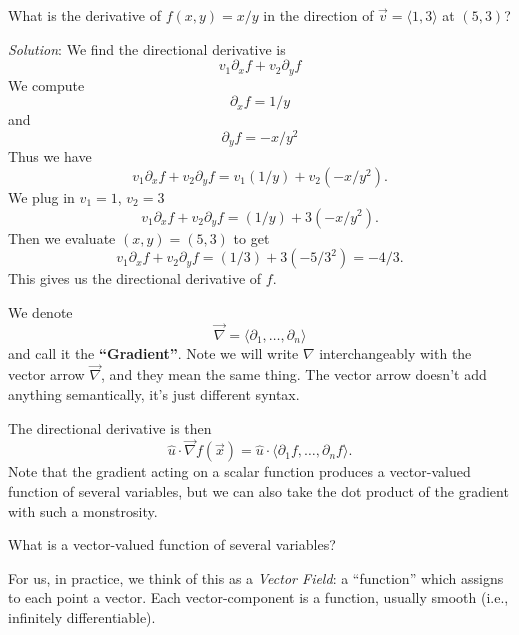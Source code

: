 \begin{example}
What is the derivative of $f(x,y)=x/y$ in the direction of
$\vec{v}=\langle 1,3\rangle$ at $(5,3)$?

\emph{Solution}: We find the directional derivative is
\begin{equation}
v_{1}\partial_{x}f + v_{2}\partial_{y}f
\end{equation}
We compute
\begin{equation}
\partial_{x}f = 1/y
\end{equation}
and
\begin{equation}
\partial_{y}f = -x/y^{2}
\end{equation}
Thus we have
\begin{equation}
v_{1}\partial_{x}f + v_{2}\partial_{y}f = v_{1}(1/y) + v_{2}(-x/y^{2}).
\end{equation}
We plug in $v_{1}=1$, $v_{2}=3$
\begin{equation}
v_{1}\partial_{x}f + v_{2}\partial_{y}f = (1/y) + 3(-x/y^{2}).
\end{equation}
Then we evaluate $(x,y)=(5,3)$ to get
\begin{equation}
v_{1}\partial_{x}f + v_{2}\partial_{y}f = (1/3) + 3(-5/3^{2})
=-4/3.
\end{equation}
This gives us the directional derivative of $f$.
\end{example}


\M We denote
\begin{equation}
\vec{\nabla} = \langle\partial_{1},\dots,\partial_{n}\rangle
\end{equation}
and call it the \textbf{``Gradient''}. Note we will write
$\nabla$ interchangeably with the vector arrow $\vec{\nabla}$,
and they mean the same thing. The vector arrow doesn't add
anything semantically, it's just different syntax.

The directional derivative is then
\begin{equation}
\widehat{u}\cdot\vec{\nabla}f(\vec{x}) = \widehat{u}\cdot\langle
\partial_{1}f,\dots,\partial_{n}f\rangle.
\end{equation}
Note that the gradient acting on a scalar function produces a
vector-valued function of several variables, but we can also take
the dot product of the gradient with such a monstrosity.

 What is a vector-valued function of several variables?

For us, in practice, we think of this as a \emph{Vector Field}: a
``function'' which assigns to each point a vector. Each
vector-component is a function, usually smooth (i.e., infinitely
differentiable). 

